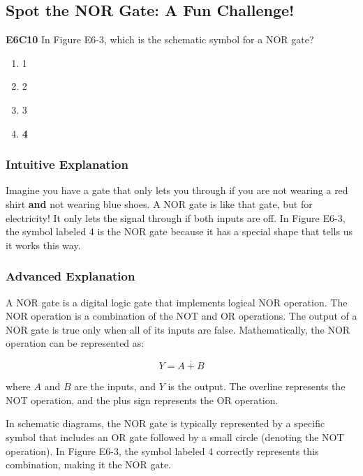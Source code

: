 \subsection{Spot the NOR Gate: A Fun Challenge!}

\begin{tcolorbox}[colback=gray!10!white,colframe=black!75!black,title=Multiple Choice Question]
\textbf{E6C10} In Figure E6-3, which is the schematic symbol for a NOR gate?
\begin{enumerate}[label=\Alph*.]
    \item 1
    \item 2
    \item 3
    \item \textbf{4}
\end{enumerate}
\end{tcolorbox}

\subsubsection*{Intuitive Explanation}
Imagine you have a gate that only lets you through if you are not wearing a red shirt \textbf{and} not wearing blue shoes. A NOR gate is like that gate, but for electricity! It only lets the signal through if both inputs are off. In Figure E6-3, the symbol labeled 4 is the NOR gate because it has a special shape that tells us it works this way.

\subsubsection*{Advanced Explanation}
A NOR gate is a digital logic gate that implements logical NOR operation. The NOR operation is a combination of the NOT and OR operations. The output of a NOR gate is true only when all of its inputs are false. Mathematically, the NOR operation can be represented as:

\[
Y = \overline{A + B}
\]

where \( A \) and \( B \) are the inputs, and \( Y \) is the output. The overline represents the NOT operation, and the plus sign represents the OR operation.

In schematic diagrams, the NOR gate is typically represented by a specific symbol that includes an OR gate followed by a small circle (denoting the NOT operation). In Figure E6-3, the symbol labeled 4 correctly represents this combination, making it the NOR gate.

